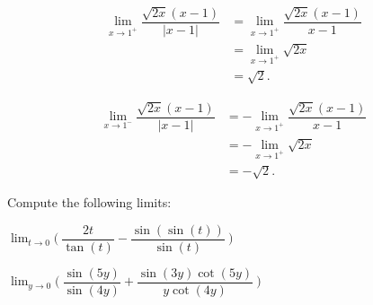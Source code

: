 \documentclass{hwset}
\begin{document}
\be
\item
\begin{solution}
	\begin{align*}
		\lim_{x\to 1^+} \dfrac{\sqrt{2x} (x - 1)}{|x - 1|} 
			&= \lim_{x\to 1^+} \dfrac{\sqrt{2x} (x - 1)}{x - 1} \\
			&= \lim_{x\to 1^+} \sqrt{2x} \\
			&= \boxed{\sqrt{2}.}
	\end{align*}
\end{solution}
\item
\begin{solution}
	\begin{align*}
		\lim_{x\to 1^-} \dfrac{\sqrt{2x} (x - 1)}{|x - 1|} 
			&= -\lim_{x\to 1^+} \dfrac{\sqrt{2x} (x - 1)}{x - 1} \\
			&= -\lim_{x\to 1^+} \sqrt{2x} \\
			&= \boxed{-\sqrt{2}.} 
	\end{align*}
\end{solution}
\ee

\begin{problem}[6.]Compute the following limits:
	\be
		\item $\lim_{t\to0}\Big(\ \dfrac{2t}{\tan(t)}-\dfrac{\sin(\sin(t))}{\sin(t)}\ \Big)$
		\item $\lim_{y\to0}\Big(\ \dfrac{\sin(5y)}{\sin(4y)}+\dfrac{\sin(3y)\cot(5y)}{y\cot(4y)}\ \Big)$\\
	\ee
\end{problem}
\end{document}

